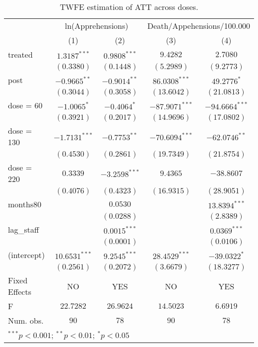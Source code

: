 
\begin{table}
\caption{TWFE estimation of ATT across doses.}
\begin{center}
\begin{tabular}{l c c c c}
\hline
 & \multicolumn{2}{c}{ln(Apprehensions)} & \multicolumn{2}{c}{Death/Appehensions/100.000} \\
\cline{2-3} \cline{4-5}
 & (1) & (2) & (3) & (4) \\
\hline
treated       & $1.3187^{***}$  & $0.9808^{***}$  & $9.4282$         & $2.7080$         \\
              & $(0.3380)$      & $(0.1448)$      & $(5.2989)$       & $(9.2773)$       \\
post          & $-0.9665^{**}$  & $-0.9014^{**}$  & $86.0308^{***}$  & $49.2776^{*}$    \\
              & $(0.3044)$      & $(0.3058)$      & $(13.6042)$      & $(21.0813)$      \\
dose = 60     & $-1.0065^{*}$   & $-0.4064^{*}$   & $-87.9071^{***}$ & $-94.6664^{***}$ \\
              & $(0.3921)$      & $(0.2017)$      & $(14.9696)$      & $(17.0802)$      \\
dose = 130    & $-1.7131^{***}$ & $-0.7753^{**}$  & $-70.6094^{***}$ & $-62.0746^{**}$  \\
              & $(0.4530)$      & $(0.2861)$      & $(19.7349)$      & $(21.8754)$      \\
dose = 220    & $0.3339$        & $-3.2598^{***}$ & $9.4365$         & $-38.8607$       \\
              & $(0.4076)$      & $(0.4323)$      & $(16.9315)$      & $(28.9051)$      \\
months80      &                 & $0.0530$        &                  & $13.8394^{***}$  \\
              &                 & $(0.0288)$      &                  & $(2.8389)$       \\
lag\_staff    &                 & $0.0015^{***}$  &                  & $0.0369^{***}$   \\
              &                 & $(0.0001)$      &                  & $(0.0106)$       \\
(intercept)   & $10.6531^{***}$ & $9.2545^{***}$  & $28.4529^{***}$  & $-39.0322^{*}$   \\
              & $(0.2561)$      & $(0.2072)$      & $(3.6679)$       & $(18.3277)$      \\
\hline
Fixed Effects & NO              & YES             & NO               & YES              \\
F             & $22.7282$       & $26.9624$       & $14.5023$        & $6.6919$         \\
Num. obs.     & $90$            & $78$            & $90$             & $78$             \\
\hline
\multicolumn{5}{l}{\scriptsize{$^{***}p<0.001$; $^{**}p<0.01$; $^{*}p<0.05$}}
\end{tabular}
\label{tab:cw_atts}
\end{center}
\end{table}
